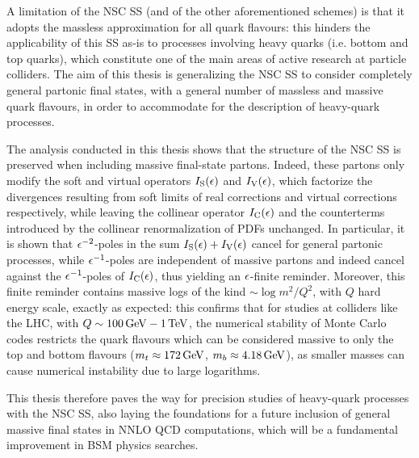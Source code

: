 A limitation of the NSC SS (and of the other aforementioned schemes) is that it adopts the massless approximation for all quark flavours: this hinders the applicability of this SS as-is to processes involving heavy quarks (i.e. bottom and top quarks), which constitute one of the main areas of active research at particle colliders. The aim of this thesis is generalizing the NSC SS to consider completely general partonic final states, with a general number of massless and massive quark flavours, in order to accommodate for the description of heavy-quark processes.

The analysis conducted in this thesis shows that the structure of the NSC SS is preserved when including massive final-state partons. Indeed, these partons only modify the soft and virtual operators $ I_\text{S}(\epsilon) $ and $ I_\text{V}(\epsilon) $, which factorize the divergences resulting from soft limits of real corrections and virtual corrections respectively, while leaving the collinear operator $ I_\text{C}(\epsilon) $ and the counterterms introduced by the collinear renormalization of PDFs unchanged. In particular, it is shown that $ \epsilon^{-2} $-poles in the sum $ I_\text{S}(\epsilon) + I_\text{V}(\epsilon) $ cancel for general partonic processes, while $ \epsilon^{-1} $-poles are independent of massive partons and indeed cancel against the $ \epsilon^{-1} $-poles of $ I_\text{C}(\epsilon) $, thus yielding an $ \epsilon $-finite reminder. Moreover, this finite reminder contains massive logs of the kind $ \sim \log m^2 / Q^2 $, with $ Q $ hard energy scale, exactly as expected: this confirms that for studies at colliders like the LHC, with $ Q \sim 100\,\mathrm{GeV} - 1\,\mathrm{TeV} $, the numerical stability of Monte Carlo codes restricts the quark flavours which can be considered massive to only the top and bottom flavours ($ m_t \approx 172 \,\mathrm{GeV} $, $ m_b \approx 4.18 \,\mathrm{GeV} $), as smaller masses can cause numerical instability due to large logarithms.

This thesis therefore paves the way for precision studies of heavy-quark processes with the NSC SS, also laying the foundations for a future inclusion of general massive final states in NNLO QCD computations, which will be a fundamental improvement in BSM physics searches.










